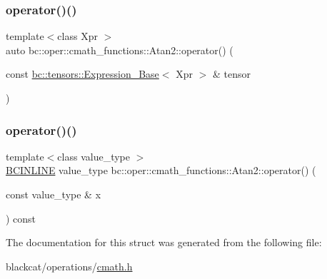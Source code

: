 \mbox{\label{structbc_1_1oper_1_1cmath__functions_1_1Atan2_afc4658ef4e3d6291e49a357a37071fa8}} 
\subsubsection{\texorpdfstring{operator()()}{operator()()}\hspace{0.1cm}{\footnotesize\ttfamily [2/3]}}
{\footnotesize\ttfamily template$<$class Xpr $>$ \\
auto bc\+::oper\+::cmath\+\_\+functions\+::\+Atan2\+::operator() (\begin{DoxyParamCaption}\item[{const \hyperlink{classbc_1_1tensors_1_1Expression__Base}{bc\+::tensors\+::\+Expression\+\_\+\+Base}$<$ Xpr $>$ \&}]{tensor }\end{DoxyParamCaption})\hspace{0.3cm}{\ttfamily [inline]}}

\mbox{\label{structbc_1_1oper_1_1cmath__functions_1_1Atan2_aa088c1a3f9aaa67f66bf0c49f1e61a1e}} 
\subsubsection{\texorpdfstring{operator()()}{operator()()}\hspace{0.1cm}{\footnotesize\ttfamily [3/3]}}
{\footnotesize\ttfamily template$<$class value\+\_\+type $>$ \\
\hyperlink{common_8h_a6699e8b0449da5c0fafb878e59c1d4b1}{B\+C\+I\+N\+L\+I\+NE} value\+\_\+type bc\+::oper\+::cmath\+\_\+functions\+::\+Atan2\+::operator() (\begin{DoxyParamCaption}\item[{const value\+\_\+type \&}]{x }\end{DoxyParamCaption}) const\hspace{0.3cm}{\ttfamily [inline]}}



The documentation for this struct was generated from the following file\+:\begin{DoxyCompactItemize}
\item 
blackcat/operations/\hyperlink{cmath_8h}{cmath.\+h}\end{DoxyCompactItemize}
